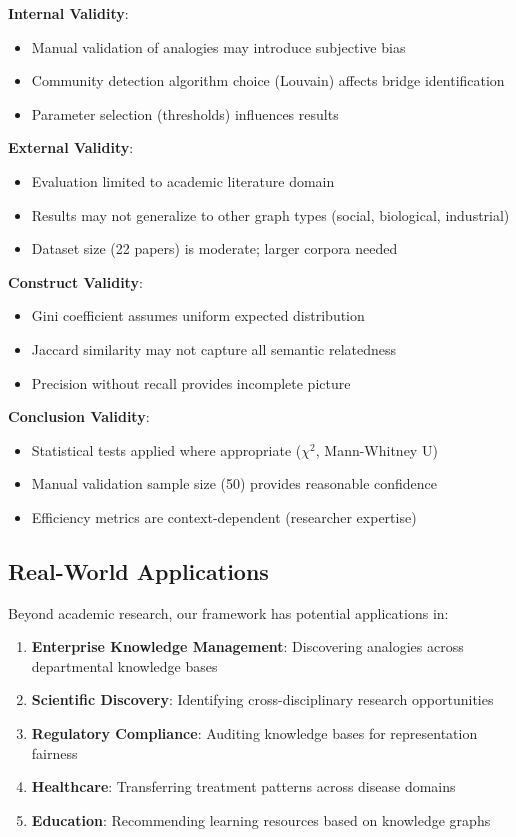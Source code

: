 \documentclass[11pt,twocolumn]{article}
\begin{document}
\textbf{Internal Validity}:
\begin{itemize}
\item Manual validation of analogies may introduce subjective bias
\item Community detection algorithm choice (Louvain) affects bridge identification
\item Parameter selection (thresholds) influences results
\end{itemize}

\textbf{External Validity}:
\begin{itemize}
\item Evaluation limited to academic literature domain
\item Results may not generalize to other graph types (social, biological, industrial)
\item Dataset size (22 papers) is moderate; larger corpora needed
\end{itemize}

\textbf{Construct Validity}:
\begin{itemize}
\item Gini coefficient assumes uniform expected distribution
\item Jaccard similarity may not capture all semantic relatedness
\item Precision without recall provides incomplete picture
\end{itemize}

\textbf{Conclusion Validity}:
\begin{itemize}
\item Statistical tests applied where appropriate ($\chi^2$, Mann-Whitney U)
\item Manual validation sample size (50) provides reasonable confidence
\item Efficiency metrics are context-dependent (researcher expertise)
\end{itemize}

\subsection{Real-World Applications}

Beyond academic research, our framework has potential applications in:

\begin{enumerate}
\item \textbf{Enterprise Knowledge Management}: Discovering analogies across departmental knowledge bases
\item \textbf{Scientific Discovery}: Identifying cross-disciplinary research opportunities
\item \textbf{Regulatory Compliance}: Auditing knowledge bases for representation fairness
\item \textbf{Healthcare}: Transferring treatment patterns across disease domains
\item \textbf{Education}: Recommending learning resources based on knowledge graphs
\end{enumerate}
\end{document}
